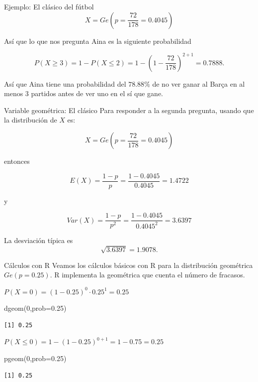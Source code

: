 \documentclass[
  ignorenonframetext,
  aspectratio=169]{beamer}
\newenvironment{Shaded}{\begin{snugshade}}{\end{snugshade}}
\newcommand{\AttributeTok}[1]{\textcolor[rgb]{0.40,0.45,0.13}{#1}}
\newcommand{\DecValTok}[1]{\textcolor[rgb]{0.68,0.00,0.00}{#1}}
\newcommand{\FloatTok}[1]{\textcolor[rgb]{0.68,0.00,0.00}{#1}}
\newcommand{\FunctionTok}[1]{\textcolor[rgb]{0.28,0.35,0.67}{#1}}
\newcommand{\NormalTok}[1]{\textcolor[rgb]{0.00,0.23,0.31}{#1}}
\begin{document}
\begin{frame}{Ejemplo: El clásico del fútbol}
\protect\hypertarget{ejemplo-el-cluxe1sico-del-fuxfatbol-2}{}
\[X=Ge\left(p=\frac{72}{178}=0.4045\right)\]

Así que lo que nos pregunta Aina es la siguiente probabilidad

\[P(X\geq 3)=1-P(X\leq 2)=1-\left(1-\frac{72}{178}\right)^{2+1}=0.7888.\]

Así que Aina tiene una probabilidad del \(78.88\%\) de no ver ganar al
Barça en al menos 3 partidos antes de ver uno en el sí que gane.
\end{frame}

\begin{frame}{Variable geométrica: El clásico}
\protect\hypertarget{variable-geomuxe9trica-el-cluxe1sico}{}
Para responder a la segunda pregunta, usando que la distribución de
\(X\) es:

\[X=Ge\left(p=\frac{72}{178}=0.4045\right)\]

entonces

\[E(X)=\frac{1-p}{p}=\frac{1-0.4045}{0.4045}=1.4722\]

y

\[Var(X)=\frac{1-p}{p^2}=\frac{1-0.4045}{0.4045^2}=3.6397\]

La desviación típica es \[\sqrt{3.6397}=1.9078.\]
\end{frame}

\begin{frame}[fragile]{Cálculos con R}
\protect\hypertarget{cuxe1lculos-con-r}{}
Veamos los cálculos básicos con R para la distribución geométrica
\(Ge(p=0.25)\). R implementa la geométrica que cuenta el número de
fracasos.

\(P(X=0)=(1-0.25)^0\cdot 0.25^1=0.25\)

\begin{Shaded}
\begin{Highlighting}[]
\FunctionTok{dgeom}\NormalTok{(}\DecValTok{0}\NormalTok{,}\AttributeTok{prob=}\FloatTok{0.25}\NormalTok{)}
\end{Highlighting}
\end{Shaded}

\begin{verbatim}
[1] 0.25
\end{verbatim}

\(P(X\leq 0)=1- (1-0.25)^{0+1}=1-0.75=0.25\)

\begin{Shaded}
\begin{Highlighting}[]
\FunctionTok{pgeom}\NormalTok{(}\DecValTok{0}\NormalTok{,}\AttributeTok{prob=}\FloatTok{0.25}\NormalTok{)}
\end{Highlighting}
\end{Shaded}

\begin{verbatim}
[1] 0.25
\end{verbatim}
\end{frame}
\end{document}
